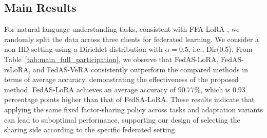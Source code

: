 \documentclass[lettersize,journal]{IEEEtran}
\begin{document}
\subsection{Main Results}
\label{subsec:main_results}
{\color{black}For natural language understanding tasks, consistent with FFA-LoRA \cite{sun2024improving}, we randomly split the data across three clients for federated learning. We consider a non-IID setting using a Dirichlet distribution with $\alpha=0.5$, i.e., Dir(0.5). From Table~\ref{tab:main_full_participation}, we observe that FedAS-LoRA, FedAS-rsLoRA, and FedAS-VeRA consistently outperform the compared methods in terms of average accuracy, demonstrating the effectiveness of the proposed method. FedAS-LoRA achieves an average accuracy of $90.77\%$, which is 0.93 percentage points higher than that of FedSA-LoRA. These results indicate that applying the same fixed factor-sharing policy across tasks and adaptation variants can lead to suboptimal performance, supporting our design of selecting the sharing side according to the specific federated setting.}

{}


\end{document}

